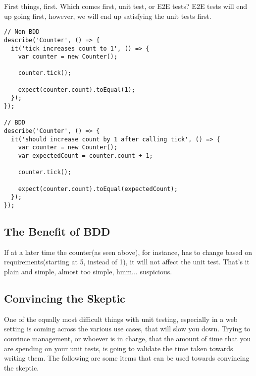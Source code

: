 First things, first. Which comes first, unit test, or E2E tests? E2E tests will
end up going first, however, we will end up satisfying the unit tests first.

\begin{lstlisting}
// Non BDD
describe('Counter', () => {
  it('tick increases count to 1', () => {
    var counter = new Counter();

    counter.tick();

    expect(counter.count).toEqual(1);
  });
});

// BDD
describe('Counter', () => {
  it('should increase count by 1 after calling tick', () => {
    var counter = new Counter();
    var expectedCount = counter.count + 1;

    counter.tick();

    expect(counter.count).toEqual(expectedCount);
  });
});
\end{lstlisting}

\subsection{ The Benefit of BDD }
If at a later time the counter(as seen above), for instance, has to change
based on requirements(starting at 5, instead of 1), it will not affect the unit
test. That's it plain and simple, almost too simple, hmm... suspicious.

\subsection{ Convincing the Skeptic }
One of the equally most difficult things with unit testing, especially in a web
setting is coming across the various use cases, that will slow you down. Trying
to convince management, or whoever is in charge, that the amount of time that
you are spending on your unit tests, is going to validate the time taken towards
writing them. The following are some items that can be used towards convincing
the skeptic.

